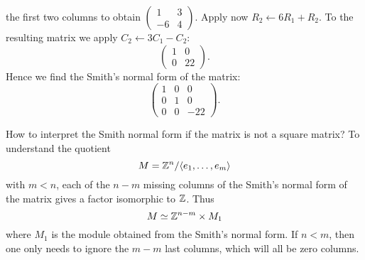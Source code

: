 \begin{example}
the first two columns to obtain 
$\begin{pmatrix}1&3\\-6&4\end{pmatrix}$. Apply now 
$R_2\leftarrow 6R_1+R_2$. To the resulting matrix we apply
$C_2\leftarrow 3C_1-C_2$:
\[
\begin{pmatrix}
    1 & 0\\
    0 & 22
\end{pmatrix}.
\]
Hence we find the Smith's normal form of the matrix: 
\[
\begin{pmatrix}
	1 & 0 & 0\\
	0 & 1 & 0\\
	0 & 0 & -22	
\end{pmatrix}.
\]
\end{example}

How to interpret the Smith normal form if the matrix is not a square matrix? 
To understand 
the quotient \[
M=\mathbb{Z}^n/\langle e_1,\dots,e_m\rangle
\]
with $m<n$, each 
of the $n-m$ missing columns
of the Smith's normal form of the matrix gives a factor isomorphic to $\mathbb{Z}$. Thus
\[
M\simeq\mathbb{Z}^{n-m}\times M_1
\]
where $M_1$ is the module obtained from the Smith's normal form. 
If 
$n<m$, then one only needs to ignore the $m-m$ last columns, which will all be 
zero columns. 

